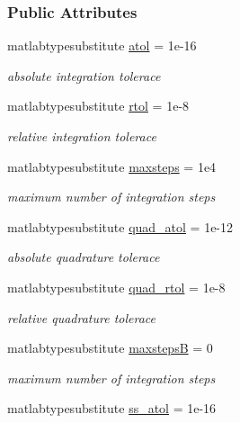 \subsubsection*{Public Attributes}
\begin{DoxyCompactItemize}
\item 
matlabtypesubstitute \mbox{\hyperlink{classamioption_a0c5f3dcf809a17b895fe12fc91272349}{atol}} = 1e-\/16
\begin{DoxyCompactList}\small\item\em absolute integration tolerace \end{DoxyCompactList}\item 
matlabtypesubstitute \mbox{\hyperlink{classamioption_a7978e9a4674f869e6b2950e2f6262ca5}{rtol}} = 1e-\/8
\begin{DoxyCompactList}\small\item\em relative integration tolerace \end{DoxyCompactList}\item 
matlabtypesubstitute \mbox{\hyperlink{classamioption_ac37622882dacee1f11688d4941ccb45e}{maxsteps}} = 1e4
\begin{DoxyCompactList}\small\item\em maximum number of integration steps \end{DoxyCompactList}\item 
matlabtypesubstitute \mbox{\hyperlink{classamioption_ad77eb68a40bc4659c33df68b373f3fd7}{quad\+\_\+atol}} = 1e-\/12
\begin{DoxyCompactList}\small\item\em absolute quadrature tolerace \end{DoxyCompactList}\item 
matlabtypesubstitute \mbox{\hyperlink{classamioption_ae6739de7f62871e1b32700da8d8d4c2f}{quad\+\_\+rtol}} = 1e-\/8
\begin{DoxyCompactList}\small\item\em relative quadrature tolerace \end{DoxyCompactList}\item 
matlabtypesubstitute \mbox{\hyperlink{classamioption_aca33b56e266b489d1211688e3c223704}{maxstepsB}} = 0
\begin{DoxyCompactList}\small\item\em maximum number of integration steps \end{DoxyCompactList}\item 
matlabtypesubstitute \mbox{\hyperlink{classamioption_a68f52483ecb095cd21d6cab5cd2efff2}{ss\+\_\+atol}} = 1e-\/16

\end{DoxyCompactItemize}

